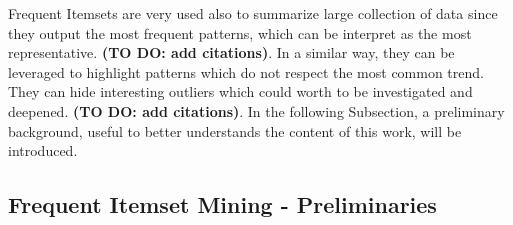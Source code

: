 Frequent Itemsets are very used also to summarize large collection of data since they output the most frequent patterns, which can be interpret as the most representative. \textbf{(TO DO: add citations)}. In a similar way, they can be leveraged to highlight patterns which do not respect the most common trend. They can hide interesting outliers which could worth to be investigated and deepened. \textbf{(TO DO: add citations)}. 
In the following Subsection, a preliminary background, useful to better understands the content of this work, will be introduced. 

\subsection{Frequent Itemset Mining - Preliminaries}


\begin{figure}[!t]
{}%
\hfil
{}
\end{figure}
